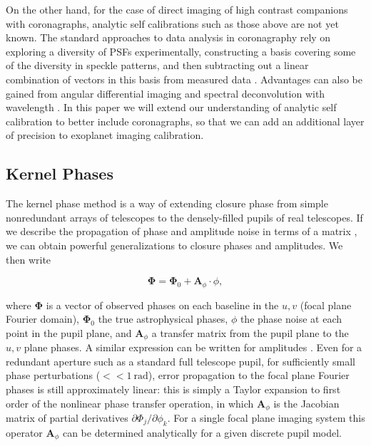 \documentclass[modern]{aastex63}
\begin{document}
On the other hand, for the case of direct imaging of high contrast companions with coronagraphs, analytic self calibrations such as those above are not yet known. The standard approaches to data analysis in coronagraphy rely on exploring a diversity of PSFs experimentally, constructing a basis covering some of the diversity in speckle patterns, and then subtracting out a linear combination of vectors in this basis from measured data \citep[e.g.][]{lafreniere07,soummer12,pueyo16}. Advantages can also be gained from angular differential imaging \citep[ADI;][]{marois06} and spectral deconvolution with wavelength \citep{sparks02}. In this paper we will extend our understanding of analytic self calibration to better include coronagraphs, so that we can add an additional layer of precision to exoplanet imaging calibration.

\subsection{Kernel Phases}

The kernel phase method is a way of extending closure phase from simple nonredundant arrays of telescopes to the densely-filled pupils of real telescopes. If we describe the propagation of phase and amplitude noise in terms of a matrix \citep{lannes1991}, we can obtain powerful generalizations to closure phases and amplitudes. We then write

\begin{equation}
    \mathbf{\Phi} = \mathbf{\Phi}_0 + \mathbf{A}_\phi \cdot \phi,
\end{equation}

\noindent where $\mathbf{\Phi}$ is a vector of observed phases on each baseline in the $u,v$ (focal plane Fourier domain), $\mathbf{\Phi}_0$ the true astrophysical phases, $\phi$ the phase noise at each point in the pupil plane, and $\mathbf{A}_\phi$ a transfer matrix from the pupil plane to the $u,v$ plane phases. A similar expression can be written for amplitudes \citep{pope16}.  Even for a redundant aperture such as a standard full telescope pupil, for sufficiently small phase perturbations ($<< 1~\text{rad}$), error propagation to the focal plane Fourier phases is still approximately linear: this is simply a Taylor expansion to first order of the nonlinear phase transfer operation, in which $\mathbf{A}_\phi$ is the Jacobian matrix of partial derivatives $\partial\Phi_j/\partial\phi_k$. For a single focal plane imaging system this operator $\mathbf{A}_\phi$ can be determined analytically for a given discrete pupil model. 
\end{document}
